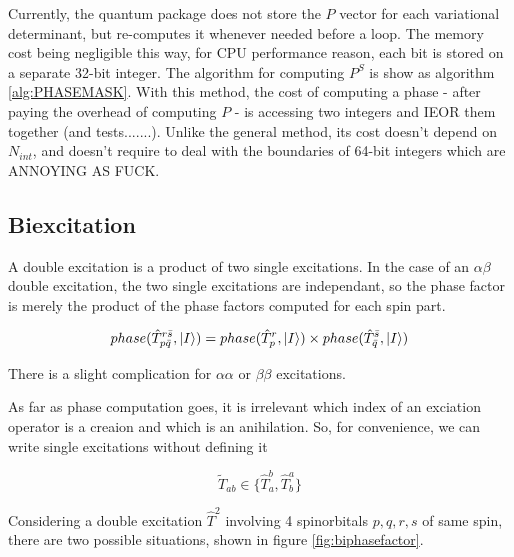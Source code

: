 Currently, the quantum package does not store the $P$ vector for each variational determinant, but re-computes it whenever needed before a loop. The memory cost being negligible this way, for CPU performance reason, each bit is stored on a separate 32-bit integer.
The algorithm for computing $P^S$ is show as algorithm \ref{alg:PHASEMASK}. 
With this method, the cost of computing a phase - after paying the overhead of computing $P$ - is accessing two integers and IEOR them together (and tests.......). Unlike the general method, its cost doesn't depend on $N_{int}$, and doesn't require to deal with the boundaries of 64-bit integers which are ANNOYING AS FUCK.
        

\subsection{Biexcitation}







A double excitation is a product of two single excitations.
In the case of an $\alpha \beta$ double excitation, the two single excitations are independant, so the phase factor is merely the product of the phase factors computed for each spin part. 


$$phase(\hat T_{p \bar q}^{r \bar s}, \ket I) = phase(\hat T_{p}^{r}, \ket I) \times phase(\hat T_{ \bar q}^{ \bar s}, \ket I) $$

There is a slight complication for $\alpha \alpha$ or $\beta \beta$ excitations.

As far as phase computation goes, it is irrelevant which index of an exciation operator is a creaion and which is an anihilation. So, for convenience, we can write single excitations without defining it

$$\tilde T_{ab} \in \{\hat T_a^b, \hat T_b^a \}$$

Considering a double excitation $\hat T^2$ involving 4 spinorbitals $p,q,r,s$ of same spin, there are two possible situations, shown in figure \ref{fig:biphasefactor}. 


